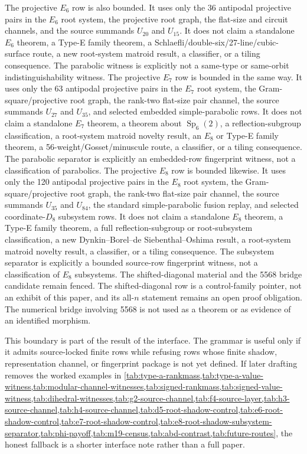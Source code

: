 The projective \(E_6\) row is also bounded.  It uses only the 36 antipodal projective pairs in the \(E_6\) root system, the projective root graph, the flat-size and circuit channels, and the source summands \(U_{20}\) and \(U_{15}\).  It does not claim a standalone \(E_6\) theorem, a Type-E family theorem, a Schlaefli/double-six/27-line/cubic-surface route, a new root-system matroid result, a classifier, or a tiling consequence.  The parabolic witness is explicitly not a same-type or same-orbit indistinguishability witness.
The projective \(E_7\) row is bounded in the same way.  It uses only the 63 antipodal projective pairs in the \(E_7\) root system, the Gram-square/projective root graph, the rank-two flat-size pair channel, the source summands \(U_{27}\) and \(U_{35}\), and selected embedded simple-parabolic rows.  It does not claim a standalone \(E_7\) theorem, a theorem about \(\operatorname{Sp}_6(2)\), a reflection-subgroup classification, a root-system matroid novelty result, an \(E_8\) or Type-E family theorem, a 56-weight/Gosset/minuscule route, a classifier, or a tiling consequence.  The parabolic separator is explicitly an embedded-row fingerprint witness, not a classification of parabolics.
The projective \(E_8\) row is bounded likewise.  It uses only the 120 antipodal projective pairs in the \(E_8\) root system, the Gram-square/projective root graph, the rank-two flat-size pair channel, the source summands \(U_{35}\) and \(U_{84}\), the standard simple-parabolic fusion replay, and selected coordinate-\(D_8\) subsystem rows.  It does not claim a standalone \(E_8\) theorem, a Type-E family theorem, a full reflection-subgroup or root-subsystem classification, a new Dynkin--Borel--de Siebenthal--Oshima result, a root-system matroid novelty result, a classifier, or a tiling consequence.  The subsystem separator is explicitly a bounded source-row fingerprint witness, not a classification of \(E_8\) subsystems.
The shifted-diagonal material and the 5568 bridge candidate remain fenced.  The shifted-diagonal row is a control-family pointer, not an exhibit of this paper, and its all-\(n\) statement remains an open proof obligation.  The numerical bridge involving 5568 is not used as a theorem or as evidence of an identified morphism.

This boundary is part of the result of the interface.  The grammar is useful only if it admits source-locked finite rows while refusing rows whose finite shadow, representation channel, or fingerprint package is not yet defined.  If later drafting removes the worked examples in \cref{tab:type-a-rankmass,tab:type-a-value-witness,tab:modular-channel-witnesses,tab:signed-rankmass,tab:signed-value-witness,tab:dihedral-witnesses,tab:g2-source-channel,tab:f4-source-layer,tab:h3-source-channel,tab:h4-source-channel,tab:d5-root-shadow-control,tab:e6-root-shadow-control,tab:e7-root-shadow-control,tab:e8-root-shadow-subsystem-separator,tab:phi-payoff,tab:m19-census,tab:abd-contrast,tab:future-routes}, the honest fallback is a shorter interface note rather than a full paper.
